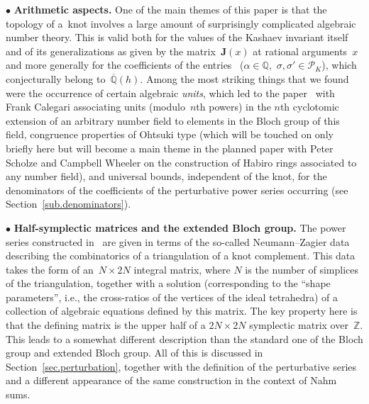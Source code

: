 \documentclass[pdftex]{sigma}
\numberwithin{equation}{section}
\def\calP{\mathcal P}
\def\calP{\mathcal P}
\def\a{\alpha}
\def\Z{\mathbb Z}
\def\Q{\mathbb Q}
\def\a{\alpha}
\def\s{\sigma}
\def\Qbar{\overline{\Q}}
\def\bJ{J} \def\bJ{\mathbf{J}}
\def\bPhi{\mathbf\Phi}
\begin{document}
$\bullet$ {\bf Arithmetic aspects.}
One of the main themes of this paper is
that the topology of a~knot involves a large amount of surprisingly complicated
algebraic number theory. This is valid both for the values of the Kashaev invariant
itself and of its generalizations as given by the matrix~$\bJ(x)$ at rational
arguments~$x$ and more generally for the coefficients of the entries~\smash{$\bPhi_\a^{(\s,\s')}(h)$} \mbox{($\a\in\Q$,~$\s,\s'\in\calP_K$)}, which conjecturally belong
to~$\Qbar(h)$. Among the most striking things that we found were the occurrence of
certain algebraic \emph{units}, which led to the paper~\cite{CGZ} with Frank Calegari
associating units (modulo~$n$th powers) in the $n$th cyclotomic extension of an
arbitrary number field to elements in the Bloch group of this field, congruence
properties of Ohtsuki type (which will be touched on only briefly here but will become
a main theme in the planned paper with Peter Scholze and Campbell Wheeler
on the construction of Habiro
rings associated to any number field), and universal bounds, independent of the knot,
for the denominators of the coefficients of the perturbative power series occurring
(see Section~\ref{sub.denominators}).

$\bullet$ {\bf Half-symplectic matrices and the extended Bloch group.}
The power series constructed in~\cite{DG,DG2} are given in terms of the
so-called Neumann--Zagier data describing the combinatorics of a triangulation of a knot
complement. This data takes the form of an~${N\times2N}$ integral matrix, where $N$ is
the number of simplices of the triangulation, together with a solution (corresponding
to the ``shape parameters'', i.e., the cross-ratios of the vertices of the ideal
tetrahedra) of a collection of algebraic equations defined by this matrix. The key
property here is
that the defining matrix is the upper half of a $2N\times2N$ symplectic matrix over~$\Z$.
This leads to a somewhat different description than the standard one of the Bloch
group and extended Bloch group. All of this is discussed in
Section~\ref{sec.perturbation}, together with the definition of the perturbative series
and a different appearance of the same construction in the context of Nahm sums.
\end{document}
